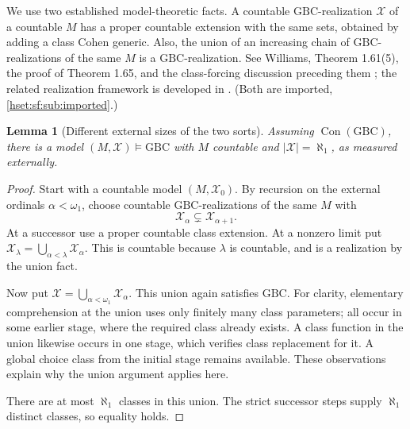 \documentclass[11pt,letterpaper]{article}
\newtheorem{lemma}[lemma]{Lemma}\aliascntresetthe{lemma}
\theoremstyle{definition}
\theoremstyle{remark}
\newcommand{\card}[1]{\lvert#1\rvert}
\newcommand{\GBC}{\mathrm{GBC}}
\newcommand{\Con}{\operatorname{Con}}
\begin{document}
We use two established model-theoretic facts. A countable $\GBC$-realization
$\mathcal X$ of a countable $M$ has a proper countable extension with the same
sets, obtained by adding a class Cohen generic. Also, the union of an increasing
chain of $\GBC$-realizations of the same $M$ is a $\GBC$-realization. See
Williams, Theorem 1.61(5), the proof of Theorem 1.65, and the class-forcing
discussion preceding them \cite{WilliamsDiss}; the related realization framework is
developed in \cite{WilliamsMin}. (Both are imported, \cref{hset:sf:sub:imported}.)

\begin{lemma}[Different external sizes of the two sorts]\label{hset:sf:lem:twosizes}
Assuming $\Con(\GBC)$, there is a model $(M,\mathcal X)\models\GBC$ with $M$
countable and $\card{\mathcal X}=\aleph_1$, as measured externally.
\end{lemma}
\begin{proof}
Start with a countable model $(M,\mathcal X_0)$. By recursion on the external
ordinals $\alpha<\omega_1$, choose countable $\GBC$-realizations of the same $M$
with
\[
 \mathcal X_\alpha\subsetneq\mathcal X_{\alpha+1}.
\]
At a successor use a proper countable class extension. At a nonzero limit put
$\mathcal X_\lambda=\bigcup_{\alpha<\lambda}\mathcal X_\alpha$. This is countable
because $\lambda$ is countable, and is a realization by the union fact.

Now put $\mathcal X=\bigcup_{\alpha<\omega_1}\mathcal X_\alpha$. This union again
satisfies $\GBC$. For clarity, elementary comprehension at the union uses only
finitely many class parameters; all occur in some earlier stage, where the required
class already exists. A class function in the union likewise occurs in one stage,
which verifies class replacement for it. A global choice class from the initial
stage remains available. These observations explain why the union argument applies
here.

There are at most $\aleph_1$ classes in this union. The strict successor steps
supply $\aleph_1$ distinct classes, so equality holds.
\end{proof}
\end{document}
